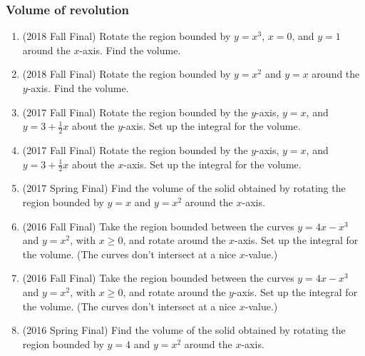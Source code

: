 \documentclass[10pt]{scrartcl}
\begin{document}
\subsubsection{Volume of revolution}
\begin{enumerate}
\item (2018 Fall Final) Rotate the region bounded by $y=x^3$, $x = 0$, and $y = 1$ around the $x$-axis. Find the volume.
\item (2018 Fall Final) Rotate the region bounded by $y=x^2$ and $y = x$ around the $y$-axis. Find the volume.
\item (2017 Fall Final) Rotate the region bounded by the $y$-axis, $y=x$, and $y=3 + \frac12 x$ about the $y$-axis. Set up the integral for the volume.
\item (2017 Fall Final) Rotate the region bounded by the $y$-axis, $y=x$, and $y=3 + \frac12 x$ about the $x$-axis. Set up the integral for the volume.
\item (2017 Spring Final) Find the volume of the solid obtained by rotating the region bounded by $y = x$ and $y = x^2$ around the $x$-axis.
\item (2016 Fall Final) Take the region bounded between the curves $y = 4x - x^3$ and $y = x^2$, with $x \ge 0$, and rotate around the $x$-axis. Set up the integral for the volume. (The curves don't intersect at a nice $x$-value.)
\item (2016 Fall Final) Take the region bounded between the curves $y = 4x - x^3$ and $y = x^2$, with $x \ge 0$, and rotate around the $y$-axis. Set up the integral for the volume. (The curves don't intersect at a nice $x$-value.)
\item (2016 Spring Final) Find the volume of the solid obtained by rotating the region bounded by $y = 4$ and $y = x^2$ around the $x$-axis. 
\end{enumerate}
\end{document}
